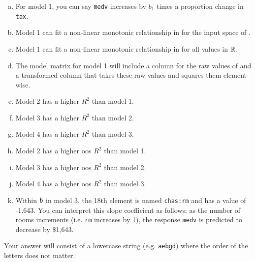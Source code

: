 \documentclass[12pt,landscape]{article}
\newcommand{\instr}{\small Your answer will consist of a lowercase string (e.g. \texttt{aebgd}) where the order of the letters does not matter. \normalsize}
\begin{document}
\begin{enumerate}[(a)]
\item For model 1, you can say \texttt{medv} increases by $b_1$ times a proportion change in \texttt{tax}.
\item Model 1 can fit a non-linear monotonic relationship in  for the input space of .
\item Model 1 can fit a non-linear monotonic relationship in  for all values in $\mathbb{R}$.
\item The model matrix for model 1 will include a column for the raw values of  and a transformed column that takes these raw values and squares them element-wise.
\item Model 2 has a higher $R^2$ than model 1.
\item Model 3 has a higher $R^2$ than model 2.
\item Model 4 has a higher $R^2$ than model 3.
\item Model 2 has a higher oos $R^2$ than model 1.
\item Model 3 has a higher oos $R^2$ than model 2.
\item Model 4 has a higher oos $R^2$ than model 3.
\item Within $\boldsymbol{b}$ in model 3, the 18th element is named \texttt{chas:rm} and has a value of -1.643. You can interpret this slope coefficient as follows: as the number of rooms increments (i.e. \texttt{rm} increases by 1), the response \texttt{medv} is predicted to decrease by \$1,643.
\end{enumerate}
\eenum\instr\pagebreak
\end{document}
